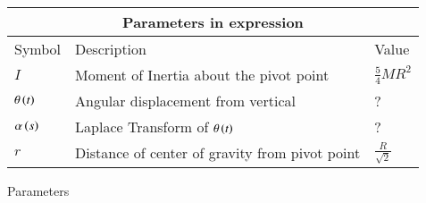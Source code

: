 \setlength{\arrayrulewidth}{0.3mm}
\setlength{\tabcolsep}{15pt}
\renewcommand{\arraystretch}{1.5}



\begin{tabular}{ |p{0.5 cm}|p{ 4cm}|p{1cm}| }
\hline
\multicolumn{3}{|c|}{Parameters in expression}\\
\hline
Symbol & Description & Value\\
\hline
$I$ & Moment of Inertia about the pivot point& $\frac{5}{4}MR^2$\\
\hline
$\theta \left(t\right)$ & Angular displacement from vertical & ?\\
\hline
$\alpha \left(s\right)$ & Laplace Transform of $\theta \left(t\right)$ & ?\\
\hline
$r$ & Distance of center of gravity from pivot point & $\frac{R}{\sqrt{2}}$\\
\hline
\end{tabular}
\caption{Parameters}


